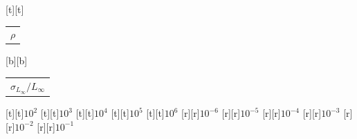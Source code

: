 %    
%
%
\begin{psfrags}%
\psfragscanon%
%
[t][t]{\color[rgb]{0,0,0}\setlength{\tabcolsep}{0pt}\begin{tabular}{c}{\Large$\rho$}\end{tabular}}%
[b][b]{\color[rgb]{0,0,0}\setlength{\tabcolsep}{0pt}\begin{tabular}{c}{\Large$\sigma_{L_\infty}/L_\infty$}\end{tabular}}%
%
[t][t]{$10^{2}$}%
[t][t]{$10^{3}$}%
[t][t]{$10^{4}$}%
[t][t]{$10^{5}$}%
[t][t]{$10^{6}$}%
%
[r][r]{$10^{-6}$}%
[r][r]{$10^{-5}$}%
[r][r]{$10^{-4}$}%
[r][r]{$10^{-3}$}%
[r][r]{$10^{-2}$}%
[r][r]{$10^{-1}$}%
%
%
\end{psfrags}%
%
